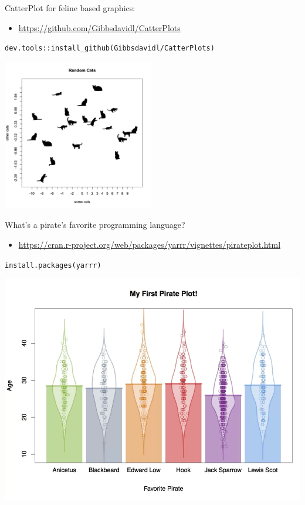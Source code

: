 \documentclass[
  ignorenonframetext,
]{beamer}
\providecommand{\tightlist}{%
  \setlength{\itemsep}{0pt}\setlength{\parskip}{0pt}}
\begin{document}
\begin{frame}[fragile]{CatterPlot for feline based graphics:}
\protect\hypertarget{catterplot-for-feline-based-graphics}{}

\begin{itemize}
\tightlist
\item
  \url{https://github.com/Gibbsdavidl/CatterPlots}
\end{itemize}

\texttt{dev.tools::install\_github(Gibbsdavidl/CatterPlots)}

\includegraphics[width=2.60417in,height=\textheight]{../external/images/funR_1_catterplotter.png}

\end{frame}

\begin{frame}[fragile]{What's a pirate's favorite programming language?}
\protect\hypertarget{whats-a-pirates-favorite-programming-language}{}

\begin{itemize}
\tightlist
\item
  \url{https://cran.r-project.org/web/packages/yarrr/vignettes/pirateplot.html}
\end{itemize}

\texttt{install.packages(\textquotesingle{}yarrr\textquotesingle{})}

\includegraphics{../external/images/funR_2_pirate.png}

\end{frame}
\end{document}
